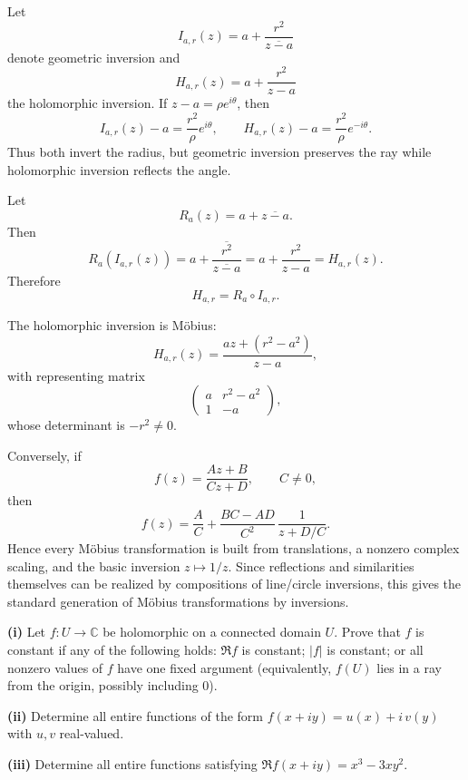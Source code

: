 \begin{solution}
Let
\[
I_{a,r}(z)=a+\frac{r^2}{\overline{z-a}}
\]
denote geometric inversion and
\[
H_{a,r}(z)=a+\frac{r^2}{z-a}
\]
the holomorphic inversion. If \(z-a=\rho e^{i\theta}\), then
\[
I_{a,r}(z)-a=\frac{r^2}{\rho}e^{i\theta},
\qquad
H_{a,r}(z)-a=\frac{r^2}{\rho}e^{-i\theta}.
\]
Thus both invert the radius, but geometric inversion preserves the ray while holomorphic inversion reflects the angle.

Let
\[
R_a(z)=a+\overline{z-a}.
\]
Then
\[
R_a(I_{a,r}(z))
=
a+\overline{\frac{r^2}{\overline{z-a}}}
=
a+\frac{r^2}{z-a}
=
H_{a,r}(z).
\]
Therefore
\[
H_{a,r}=R_a\circ I_{a,r}.
\]

The holomorphic inversion is M\"obius:
\[
H_{a,r}(z)
=
\frac{az+(r^2-a^2)}{z-a},
\]
with representing matrix
\[
\begin{pmatrix}
a&r^2-a^2\\
1&-a
\end{pmatrix},
\]
whose determinant is \(-r^2\neq0\).

Conversely, if
\[
f(z)=\frac{Az+B}{Cz+D},
\qquad C\neq0,
\]
then
\[
f(z)
=
\frac AC
+
\frac{BC-AD}{C^2}\,
\frac{1}{z+D/C}.
\]
Hence every M\"obius transformation is built from translations, a nonzero complex scaling, and the basic inversion \(z\mapsto1/z\). Since reflections and similarities themselves can be realized by compositions of line/circle inversions, this gives the standard generation of M\"obius transformations by inversions.
\end{solution}


\begin{problem}[CP-IV-0072]
\label{prob:cp-iv-0072}
\par\noindent\textbf{(i)} Let $f:U\to\mathbb C$ be holomorphic on a connected domain $U$.
Prove that $f$ is constant if any of the following holds: $\Re f$ is constant;
$|f|$ is constant; or all nonzero values of $f$ have one fixed argument
(equivalently, $f(U)$ lies in a ray from the origin, possibly including $0$).

\par\noindent\textbf{(ii)} Determine all entire functions of the form
$f(x+iy)=u(x)+i\,v(y)$ with $u,v$ real-valued.

\par\noindent\textbf{(iii)} Determine all entire functions satisfying
$\Re f(x+iy)=x^3-3xy^2$.
\end{problem}

